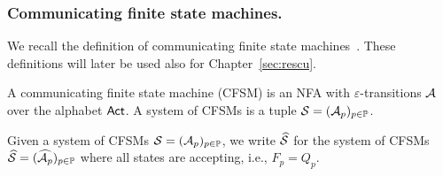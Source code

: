 

  


\subsubsection*{Communicating finite state machines.}
We recall the definition of communicating finite state machines~\cite{BrandZafiropulo}.
These definitions will later be used also for Chapter~\ref{sec:rescu}.

\bigskip

\begin{definition}[CFSM]\label{def:cfsm}
    A communicating finite state machine (CFSM) is an NFA 
	with $\varepsilon$-transitions $\mathcal{A}$ over the alphabet $\mathsf{Act}$.
    A system of CFSMs is a tuple $\mathcal{S} = (\mathcal{A}_p)_{p\in\mathbb{P}}$.
\end{definition}

Given a system of CFSMs $\mathcal{S}=(\mathcal{A}_p)_{p\in\mathbb{P}}$,
we write $\widehat{\mathcal{S}}{}$ for the system of CFSMs 
$\widehat{\mathcal{S}}=(\widehat{\mathcal{A}_p})_{p\in\mathbb{P}}$
where all states are accepting, i.e., $F_p = Q_p$.

\bigskip


